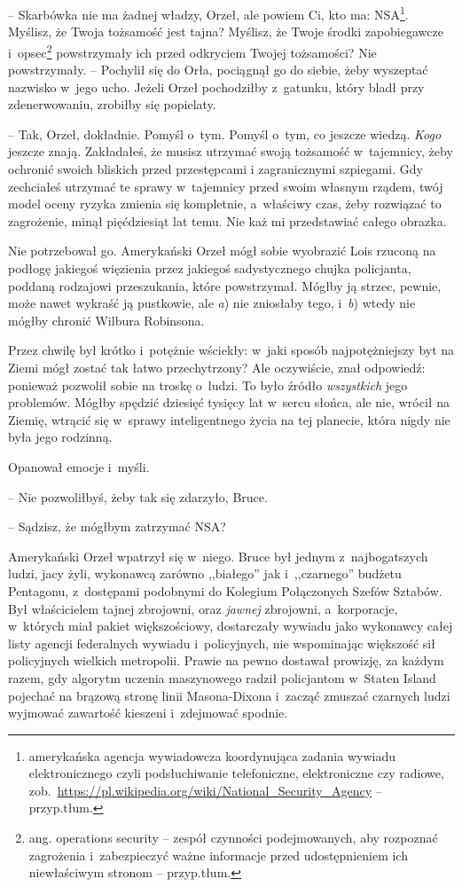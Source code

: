 \documentclass[oneside,polish,11pt,sfheadings]{mwbk}
\begin{document}
-- Skarbówka nie ma żadnej władzy, Orzeł, ale powiem Ci, kto ma: NSA\footnote{
amerykańska agencja wywiadowcza koordynująca zadania wywiadu
elektronicznego czyli podsłuchiwanie telefoniczne, elektroniczne czy
radiowe, zob.~\url{https://pl.wikipedia.org/wiki/National\_Security\_Agency}
-- przyp.tłum.}. Myślisz, że Twoja tożsamość jest tajna? Myślisz, że
Twoje środki zapobiegawcze i~opsec\footnote{ ang. operations security -- zespół
czynności podejmowanych, aby rozpoznać zagrożenia i~zabezpieczyć ważne
informacje przed udostępnieniem ich niewłaściwym stronom -- przyp.tłum.}
powstrzymały ich przed odkryciem Twojej tożsamości? Nie powstrzymały. -- Pochylił się do Orła, pociągnął go do siebie, żeby wyszeptać nazwisko w~jego ucho. Jeżeli Orzeł pochodziłby z~gatunku, który bladł przy
zdenerwowaniu, zrobiłby się popielaty.

-- Tak, Orzeł, dokładnie. Pomyśl o~tym. Pomyśl o~tym, co jeszcze wiedzą.
\textit{Kogo} jeszcze znają. Zakładałeś, że musisz utrzymać swoją
tożsamość w~tajemnicy, żeby ochronić swoich bliskich przed przestępcami
i zagranicznymi szpiegami. Gdy zechciałeś utrzymać te sprawy w~tajemnicy
przed swoim własnym rządem, twój model oceny ryzyka zmienia się
kompletnie, a~właściwy czas, żeby rozwiązać to zagrożenie, minął
pięćdziesiąt lat temu. Nie każ mi przedstawiać całego obrazka.

Nie potrzebował go. Amerykański Orzeł mógł sobie wyobrazić Lois rzuconą
na podłogę jakiegoś więzienia przez jakiegoś sadystycznego chujka
policjanta, poddaną rodzajowi przeszukania, które powstrzymał. Mógłby ją
strzec, pewnie, może nawet wykraść ją pustkowie, ale \textit{a}) nie
zniosłaby tego, i~\textit{b}) wtedy nie mógłby chronić Wilbura Robinsona.

Przez chwilę był krótko i~potężnie wściekły: w~jaki sposób
najpotężniejszy byt na Ziemi mógł zostać tak łatwo przechytrzony? Ale
oczywiście, znał odpowiedź: ponieważ pozwolił sobie na troskę o~ludzi.
To było źródło \textit{wszystkich} jego problemów. Mógłby spędzić dziesięć
tysięcy lat w~sercu słońca, ale nie, wrócił na Ziemię, wtrącić się w~sprawy inteligentnego życia na tej planecie, która nigdy nie była jego
rodzinną.

Opanował emocje i~myśli. 

-- Nie pozwoliłbyś, żeby tak się zdarzyło,
Bruce.

-- Sądzisz, że mógłbym zatrzymać NSA?

Amerykański Orzeł wpatrzył się w~niego. Bruce był jednym z~najbogatszych
ludzi, jacy żyli, wykonawcą zarówno ,,białego'' jak i~,,czarnego''
budżetu Pentagonu, z~dostępami podobnymi do Kolegium Połączonych Szefów
Sztabów. Był właścicielem tajnej zbrojowni, oraz \textit{jawnej}
zbrojowni, a~korporacje, w~których miał pakiet większościowy,
dostarczały wywiadu jako wykonawcy całej listy agencji federalnych
wywiadu i~policyjnych, nie wspominając większość sił policyjnych
wielkich metropolii. Prawie na pewno dostawał prowizję, za każdym razem,
gdy algorytm uczenia maszynowego radził policjantom w~Staten Island
pojechać na brązową stronę linii Masona-Dixona i~zacząć zmuszać czarnych
ludzi wyjmować zawartość kieszeni i~zdejmować spodnie.
\end{document}
